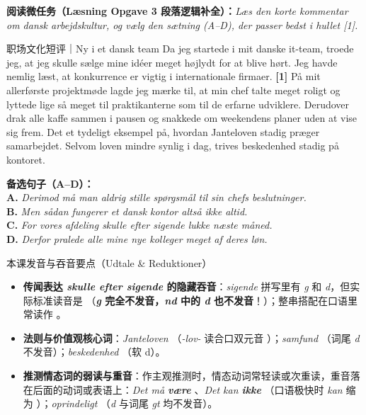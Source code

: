 \textbf{阅读微任务（Læsning Opgave 3 段落逻辑补全）：}\textit{Læs den korte kommentar om dansk arbejdskultur, og vælg den sætning (A--D), der passer bedst i hullet [1].}

\begin{emailbox}{职场文化短评｜Ny i et dansk team}
Da jeg startede i mit danske it-team, troede jeg, at jeg skulle sælge mine idéer meget højlydt for at blive hørt. Jeg havde nemlig læst, at konkurrence er vigtig i internationale firmaer. \underline{\hspace{2.8cm}} \textbf{[1]} På mit allerførste projektmøde lagde jeg mærke til, at min chef talte meget roligt og lyttede lige så meget til praktikanterne som til de erfarne udviklere. Derudover drak alle kaffe sammen i pausen og snakkede om weekendens planer uden at vise sig frem. Det  et tydeligt eksempel på, hvordan Janteloven stadig præger samarbejdet. Selvom loven  mindre synlig i dag, trives beskedenhed stadig på kontoret.
\end{emailbox}

\noindent\small\textbf{备选句子（A--D）：}\\
\textbf{A.} \textit{Derimod må man aldrig stille spørgsmål til sin chefs beslutninger.}\\
\textbf{B.} \textit{Men sådan fungerer et dansk kontor altså ikke altid.}\\
\textbf{C.} \textit{For vores afdeling skulle efter sigende lukke næste måned.}\\
\textbf{D.} \textit{Derfor pralede alle mine nye kolleger meget af deres løn.}

\begin{tipbox}{本课发音与吞音要点（Udtale \& Reduktioner）}
\begin{itemize}
  \item \textbf{传闻表达 \textit{skulle efter sigende} 的隐藏吞音}：\textit{sigende} 拼写里有 \textit{g} 和 \textit{d}，但实际标准读音是 （\textbf{\textit{g} 完全不发音，\textit{nd} 中的 \textit{d} 也不发音}！）；整串搭配在口语里常读作 。
  \item \textbf{法则与价值观核心词}：\textit{Janteloven} （\textit{-lov-} 读合口双元音 ）；\textit{samfund} （词尾 \textit{d} 不发音）；\textit{beskedenhed} （软 d）。
  \item \textbf{推测情态词的弱读与重音}：作主观推测时，情态动词常轻读或次重读，重音落在后面的动词或表语上：\textit{Det må \textbf{være}} 、\textit{Det kan \textbf{ikke}} （口语极快时 \textit{kan} 缩为 ）；\textit{oprindeligt} （\textit{d} 与词尾 \textit{gt} 均不发音）。
\end{itemize}
\end{tipbox}

